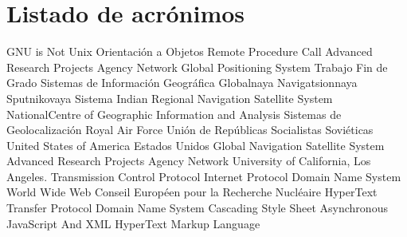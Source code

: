 \chapter{Listado de acrónimos}

{\small
\begin{acronym}[XXXXXXXX]
  		{\acs{GNU} is Not Unix}
  			{Orientación a Objetos}
  		{Remote Procedure Call}
  	{Advanced Research Projects Agency Network}
  		{Global Positioning System}
  		{Trabajo Fin de Grado}
  		{Sistemas de Información Geográfica}
  	{Globalnaya Navigatsionnaya Sputnikovaya Sistema}
  		{Indian Regional Navigation Satellite System}
  		{NationalCentre of Geographic Information and Analysis}
  			{Sistemas de Geolocalización}
  		{Royal Air Force}
  		{Unión de Repúblicas Socialistas Soviéticas}
  		{United States of America}
  		{Estados Unidos}
  		{Global Navigation Satellite System}
  	{Advanced Research Projects Agency Network}
  		{University of California, Los Angeles}.
  		{Transmission Control Protocol}
  			{Internet Protocol}
  		{Domain Name System}
  		{World Wide Web}
  		{Conseil Européen pour la Recherche Nucléaire}
  		{HyperText Transfer Protocol}
  		{Domain Name System}
  		{Cascading Style Sheet}
  		{Asynchronous JavaScript And XML}
  		{HyperText Markup Language}
\end{acronym}
}




